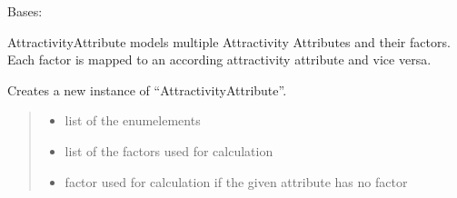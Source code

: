 \documentclass[letterpaper,10pt,english]{sphinxmanual}
\begin{document}
\begin{fulllineitems}
\label{\detokenize{apidoc/src.osm_configurator.model.project.configuration:src.osm_configurator.model.project.configuration.attractivity_attribute.AttractivityAttribute}}
\pysigstartsignatures
{}
\pysigstopsignatures
\sphinxAtStartPar
Bases: 

\sphinxAtStartPar
AttractivityAttribute models multiple Attractivity Attributes
and their factors. Each factor is mapped to an according attractivity attribute
and vice versa.

\begin{fulllineitems}
\label{\detokenize{apidoc/src.osm_configurator.model.project.configuration:src.osm_configurator.model.project.configuration.attractivity_attribute.AttractivityAttribute.__init__}}
\pysigstartsignatures
{}
\pysigstopsignatures
\sphinxAtStartPar
Creates a new instance of “AttractivityAttribute”.
\begin{quote}\begin{description}
\begin{itemize}
\item {} 
\sphinxAtStartPar
{} \textendash{} list of the enum\sphinxhyphen{}elements

\item {} 
\sphinxAtStartPar
{} \textendash{} list of the factors used for calculation

\item {} 
\sphinxAtStartPar
{} \textendash{} factor used for calculation if the given attribute has no factor

\end{itemize}

\end{description}\end{quote}


\end{fulllineitems}
\end{fulllineitems}
\end{document}
